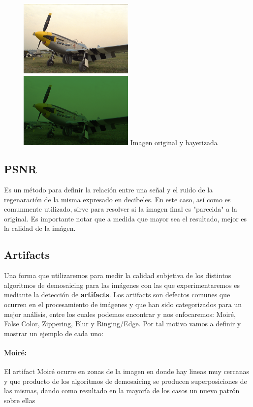 \begin{figure}[h]
       \includegraphics[width=0.5\textwidth]{imagenes/img9.png}
           \hfill
        \includegraphics[width=0.5\textwidth]{imagenes/img9_bayer.png}   
        Imagen original y bayerizada
\end{figure}
\newpage

\subsection{PSNR}
Es un método para definir la relación entre una señal y el ruido de la regenaración de la misma expresado en decibeles. En este caso, así como es comunmente utilizado, sirve para resolver si la imagen final es "parecida" a la original. Es importante notar que a medida que mayor sea el resultado, mejor es la calidad de la imágen.


\subsection{Artifacts}

Una forma que utilizaremos para medir la calidad subjetiva de los distintos algoritmos de demosaicing para las imágenes con las que experimentaremos es mediante la detección de \textbf{artifacts}. Los artifacts son defectos comunes que ocurren en el procesamiento de imágenes y que han sido categorizados para un mejor análisis, entre los cuales podemos encontrar y nos enfocaremos: Moiré, False Color, Zippering, Blur y Ringing/Edge. Por tal motivo vamos a definir y mostrar un ejemplo de cada uno:

\paragraph{Moiré:}
El artifact Moiré ocurre en zonas de la imagen en donde hay lineas muy cercanas y que producto de los algoritmos de demosaicing se producen superposiciones de las mismas, dando como resultado en la mayoría de los casos un nuevo patrón sobre ellas

